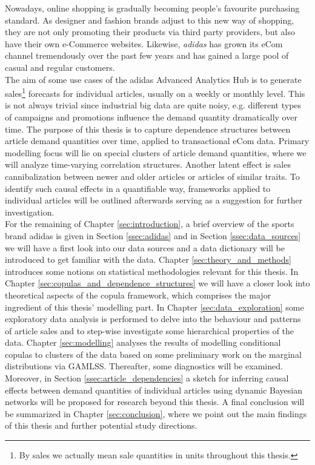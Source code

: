 

Nowadays, online shopping is gradually becoming people's favourite purchasing standard. As designer and fashion brands adjust to this new way of shopping, they are not only promoting their products via third party 	providers, but also have their own e-Commerce websites. Likewise, \textit{adidas} has grown its eCom channel tremendously over the past few years and has gained a large pool of casual and regular customers.
\\

The aim of some use cases of the adidas Advanced Analytics Hub is to generate sales\footnote{By sales we actually mean sale quantities in units throughout this thesis.} forecasts for individual articles, usually on a weekly or monthly level. This is not always trivial since industrial big data are quite noisy, e.g. different types of campaigns and promotions influence the demand quantity dramatically over time. The purpose of this thesis is to capture dependence structures between article demand quantities over time, applied to transactional eCom data. Primary modelling focus will lie on special clusters of article demand quantities, where we will analyze time-varying correlation structures. Another latent effect is sales cannibalization between newer and older articles or articles of similar traits. To identify such causal effects in a quantifiable way, frameworks applied to individual articles will be outlined afterwards serving as a suggestion for further investigation.
\\

For the remaining of Chapter \ref{sec:introduction}, a brief overview of the sports brand adidas is given in Section \ref{ssec:adidas} and in Section \ref{ssec:data_sources} we will have a first look into our data sources and a data dictionary will be introduced to get familiar with the data. Chapter \ref{sec:theory_and_methods} introduces some notions on statistical methodologies relevant for this thesis. In Chapter \ref{sec:copulas_and_dependence_structures} we will have a closer look into theoretical aspects of the copula framework, which comprises the major ingredient of this thesis' modelling part. In Chapter \ref{sec:data_exploration} some exploratory data analysis is performed to delve into the behaviour and patterns of article sales and to step-wise investigate some hierarchical properties of the data.  Chapter \ref{sec:modelling} analyses the results of modelling conditional copulas to clusters of the data based on some preliminary work on the marginal distributions via GAMLSS. Thereafter, some diagnostics will be examined. Moreover, in Section \ref{ssec:article_dependencies} a sketch for inferring causal effects between demand quantities of individual articles using dynamic Bayesian networks will be proposed for research beyond this thesis. A final conclusion will be summarized in Chapter \ref{sec:conclusion}, where we point out the main findings of this thesis and further potential study directions.




